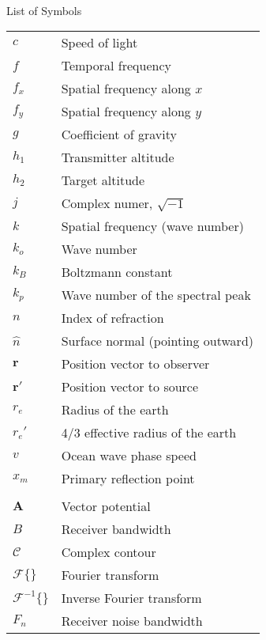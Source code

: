 \renewcommand{\baselinestretch}{1}
\small\normalsize
\hbox{\ }

\vspace{-4em}

\begin{center}
\large{List of Symbols}
\end{center} 

\vspace{3pt}

\begin{supertabular}{ll}
$c$ & Speed of light \\
$f$ & Temporal frequency \\
$f_x$ & Spatial frequency along $x$ \\
$f_y$ & Spatial frequency along $y$ \\
$g$ & Coefficient of gravity \\
$h_1$ & Transmitter altitude\\
$h_2$ & Target altitude \\
$j$ & Complex numer, $\sqrt{-1}$ \\
$k$ & Spatial frequency (wave number) \\
$k_o$ & Wave number \\
$k_B$ & Boltzmann constant \\
$k_p$ & Wave number of the spectral peak \\
$n$ & Index of refraction \\
$\hat{n}$ & Surface normal (pointing outward) \\
$\mathbf{r}$ & Position vector to observer \\
$\mathbf{r}'$ & Position vector to source \\
$r_e$ & Radius of the earth \\
$r_e'$ & 4/3 effective radius of the earth \\
$v$ & Ocean wave phase speed \\
$x_m$ & Primary reflection point \\
\\
$\mathbf{A}$ & Vector potential \\
$B$ & Receiver bandwidth \\
$\mathcal{C}$ & Complex contour \\
$\mathcal{F}\{\}$ & Fourier transform \\
$\mathcal{F}^{-1}\{\}$ & Inverse Fourier transform \\
$F_n$ & Receiver noise bandwidth \\

\end{supertabular}
